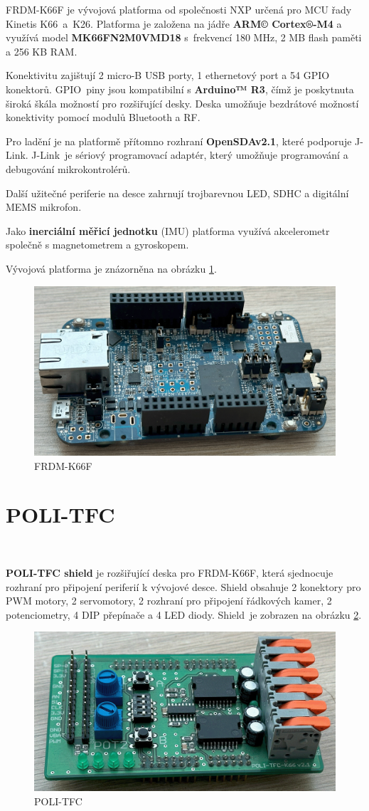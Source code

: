 FRDM-K66F je vývojová platforma od společnosti NXP určená pro MCU řady Kinetis
K66~a~K26. Platforma je založena na jádře \textbf{ARM© Cortex®-M4} a využívá model
\textbf{MK66FN2M0VMD18} s~frekvencí 180 MHz, 2 MB flash paměti a 256 KB RAM.

Konektivitu zajištují 2 micro-B USB porty, 1 ethernetový port a 54 GPIO konektorů.
GPIO~piny jsou kompatibilní s \textbf{Arduino™ R3}, čímž je poskytnuta široká škála
možností pro rozšiřující desky. Deska umožňuje bezdrátové možností konektivity
pomocí modulů Bluetooth a RF.

Pro ladění je na platformě přítomno rozhraní \textbf{OpenSDAv2.1}, které podporuje
J-Link. J-Link~je sériový programovací adaptér, který umožňuje programování a
debugování mikrokontrolérů.

Další užitečné periferie na desce zahrnují trojbarevnou LED, SDHC a digitální MEMS
mikrofon.

Jako \textbf{inerciální měřicí jednotku} (IMU) platforma využívá akcelerometr
společně s magnetometrem a gyroskopem\cite{frdmk66UserGuide}.

Vývojová platforma je znázorněna na obrázku \ref{fig:FRDM-K66F}.
\begin{figure}[!h]
    \centering
    \includegraphics[width = .46\linewidth]{Figures/FRDM-K66F.png}
    \caption{FRDM-K66F}
    \label{fig:FRDM-K66F}
    \vspace{-20pt}
\end{figure}

\section{POLI-TFC}
\label{sec:POLI-TFC}\

\textbf{POLI-TFC shield} je rozšiřující deska pro FRDM-K66F, která sjednocuje
rozhraní pro připojení periferií k vývojové desce. Shield obsahuje 2 konektory
pro PWM motory, 2 servomotory, 2 rozhraní pro připojení řádkových kamer,
2 potenciometry, 4 DIP přepínače a 4 LED diody. Shield~je zobrazen na obrázku
\ref{fig:POLI-TFC}.
\begin{figure}[!h]
    \centering
    \includegraphics[width = .46\linewidth]{Figures/POLI-TFC.png}
    \caption{POLI-TFC}
    \label{fig:POLI-TFC}
    \vspace{-15pt}
\end{figure}
